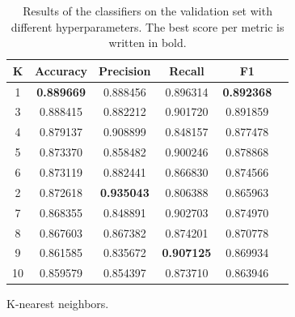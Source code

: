\begin{appendices}
\begin{table}[ht]
\bigskip
\begin{subtable}{\textwidth}
\begin{adjustbox}{minipage=15cm, center}
\centering
\begin{tabular*}{\textwidth}{c @{\extracolsep{\fill}} ccccc}
\toprule
K &  Accuracy &  Precision &    Recall &        F1 \\
\midrule
1  &  \textbf{0.889669} &   0.888456 &  0.896314 &  \textbf{0.892368} \\
3  &  0.888415 &   0.882212 &  0.901720 &  0.891859 \\
4  &  0.879137 &   0.908899 &  0.848157 &  0.877478 \\
5  &  0.873370 &   0.858482 &  0.900246 &  0.878868 \\
6  &  0.873119 &   0.882441 &  0.866830 &  0.874566 \\
2  &  0.872618 &   \textbf{0.935043} &  0.806388 &  0.865963 \\
7  &  0.868355 &   0.848891 &  0.902703 &  0.874970 \\
8  &  0.867603 &   0.867382 &  0.874201 &  0.870778 \\
9  &  0.861585 &   0.835672 &  \textbf{0.907125} &  0.869934 \\
10 &  0.859579 &   0.854397 &  0.873710 &  0.863946 \\
\bottomrule
\end{tabular*}
\caption{K-nearest neighbors.}
\label{tab:knn}

\end{adjustbox}
\end{subtable}
\caption{Results of the classifiers on the validation set with different hyperparameters. The best score per metric is written in bold.} 
\label{appendix:Hyperparameters}
\end{table}

\end{appendices}

